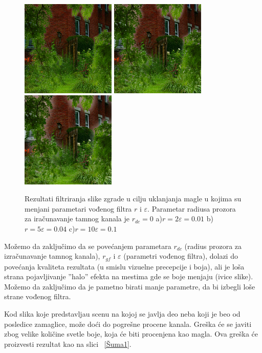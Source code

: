 \documentclass[a4paper,12pt,titlepage]{article}
\begin{document}
\begin{figure}[ht!]
\centering
\includegraphics[width=45mm]{img/hazeResGF2_01.png}
\includegraphics[width=45mm]{img/hazeResGF5_04.png}
\includegraphics[width=45mm]{img/hazeResGF10_1.png}
\caption{Rezultati filtriranja slike zgrade u cilju uklanjanja magle u kojima su menjani parametari vođenog filtra $r$ i $\varepsilon$. Parametar radiusa prozora  za iračunavanje tamnog kanala je $r_{dc} = 0$ a)$r = 2 \varepsilon = 0.01$ b)$r = 5 \varepsilon = 0.04$ c)$r = 10 \varepsilon = 0.1$}
\label{UticajRdc}
\end{figure} 

Možemo da zaključimo da se povećanjem parametara $r_{dc}$ (radius prozora za izračunavanje tamnog kanala), $r_{gf}$ i $\varepsilon$ (parametri vođenog filtra), dolazi do povećanja kvaliteta rezultata (u smislu vizuelne precepcije i boja), ali je loša strana pojavljivanje ''halo'' efekta na mestima gde se boje menjaju (ivice slike). Možemo da zaključimo da je pametno birati manje parametre, da bi izbegli loše strane vođenog filtra.

Kod slika koje predstavljau scenu na kojoj se javlja deo neba koji je beo od posledice zamaglice, može doći do pogrešne procene kanala. Greška će se javiti zbog velike količine svetle boje, koja će biti procenjena kao magla. Ova greška će proizvesti rezultat kao na slici ~\ref{Šuma1}.
\end{document}
